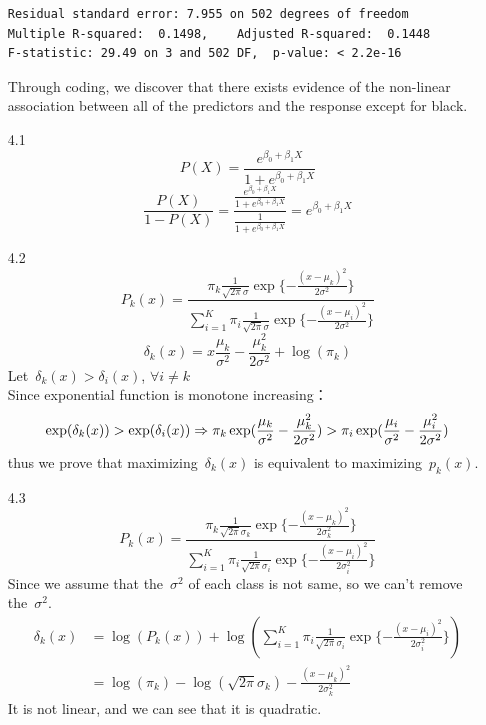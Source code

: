 \documentclass[12pt]{article}
\begin{document}
\begin{itemize}
\begin{verbatim}
Residual standard error: 7.955 on 502 degrees of freedom
Multiple R-squared:  0.1498,	Adjusted R-squared:  0.1448
F-statistic: 29.49 on 3 and 502 DF,  p-value: < 2.2e-16
\end{verbatim}
Through coding, we discover that there exists evidence of the non-linear association between all of the predictors and the response except for black.
\item[4.1]
$$P(X)=\frac{e^{\beta_{0}+\beta_{1}X}}{1+e^{\beta_{0}+\beta_{1}X}}$$
$$\frac{P(X)}{1-P(X)}=\frac{\frac{e^{\beta_{0}+\beta_{1}X}}{1+e^{\beta_{0}+\beta_{1}X}}}{\frac{1}{1+e^{\beta_{0}+\beta_{1}X}}}=e^{\beta_{0}+\beta_{1}X}$$
\item[4.2]
$$P_{k}(x)=\frac{\pi_{k}\frac{1}{\sqrt{2\pi}\sigma}\exp\{-{\frac{(x-\mu_{k})^2}{2\sigma^2}}\}}{\sum_{i=1}^{K}\pi_{i}\frac{1}{\sqrt{2\pi}\sigma}\exp\{-{\frac{(x-\mu_{i})^2}{2\sigma^2}}\}}$$
$$\delta_{k}(x)=x\frac{\mu_{k}}{\sigma^2}-\frac{\mu_{k}^2}{2\sigma^2}+\log(\pi_{k})$$
Let\ $\delta_{k}(x)>\delta_{i}(x)$, $\forall i\neq k$\\[3ex]
Since exponential function is monotone increasing：
$$
\exp(\delta_{k}(x))>\exp(\delta_{i}(x))\\
\Rightarrow\pi_{k}\exp(\frac{\mu_{k}}{\sigma^2}-\frac{\mu_{k}^2}{2\sigma^2})>\pi_{i}\exp(\frac{\mu_{i}}{\sigma^2}-\frac{\mu_{i}^2}{2\sigma^2})
$$
thus we prove that maximizing\ $\delta_{k}(x)$ is equivalent to maximizing\ $p_{k}(x)$.
\item[4.3]
$$P_{k}(x)=\frac{\pi_{k}\frac{1}{\sqrt{2\pi}\sigma_{k}}\exp\{-{\frac{(x-\mu_{k})^2}{2\sigma_{k}^2}}\}}{\sum_{i=1}^{K}\pi_{i}\frac{1}{\sqrt{2\pi}\sigma_{i}}\exp\{-{\frac{(x-\mu_{i})^2}{2\sigma_{i}^2}}\}}$$
Since we assume that the\ $\sigma^2$ of each class is not same, so we can't remove the\ $\sigma^2$.
\begin{align*}
\delta_{k}(x)
&=\log(P_{k}(x))+\log(\sum_{i=1}^{K}\pi_{i}\frac{1}{\sqrt{2\pi}\sigma_{i}}\exp\{-{\frac{(x-\mu_{i})^2}{2\sigma_{i}^2}}\})\\
&=\log(\pi_{k})-\log(\sqrt{2\pi}\sigma_{k})-\frac{(x-\mu_{k})^2}{2\sigma_{k}^2}
\end{align*}
It is not linear, and we can see that it is quadratic.
\end{itemize}
\end{document}
